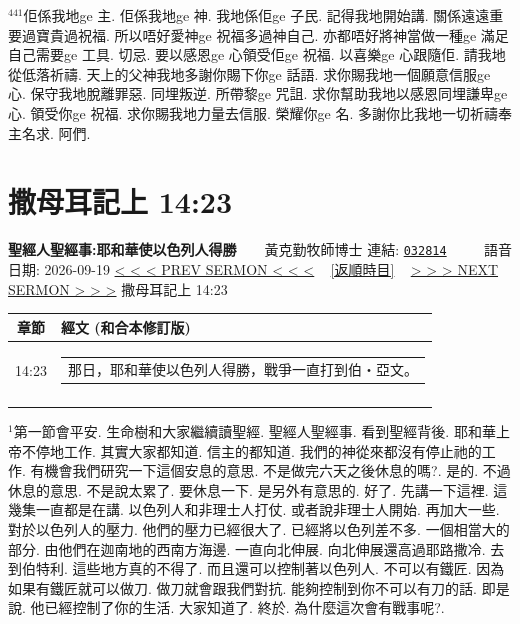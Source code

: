 \documentclass{book}
\begin{document}
$^{441}$佢係我地ge 主.
佢係我地ge 神.
我地係佢ge 子民.
記得我地開始講.
關係遠遠重要過寶貴過祝福.
所以唔好愛神ge 祝福多過神自己.
亦都唔好將神當做一種ge 滿足自己需要ge 工具.
切忌.
要以感恩ge 心領受佢ge 祝福.
以喜樂ge 心跟隨佢.
請我地從低落祈禱.
天上的父神我地多謝你賜下你ge 話語.
求你賜我地一個願意信服ge 心.
保守我地脫離罪惡.
同埋叛逆.
所帶黎ge 咒詛.
求你幫助我地以感恩同埋謙卑ge 心.
領受你ge 祝福.
求你賜我地力量去信服.
榮耀你ge 名.
多謝你比我地一切祈禱奉主名求.
阿們.
\newpage



\section{撒母耳記上 14:23}
\label{sec:032814}
\textbf{聖經人聖經事:耶和華使以色列人得勝}~~~~黃克勤牧師博士
\newline
\newline
連結: \href{http://www.church.com.hk/acms/content.asp?site=cdc\&op=show\&type=product\&code=032814\&layout=sermon}{\texttt{032814}} ~~~~ 語音日期: 2026-09-19
\newline
\newline
\hyperref[sec:032813]{\small{< < < PREV SERMON < < <}}
~
\hyperref[sec:index_chronic]{\small{[返順時目]}}
~
\hyperref[sec:032815]{\small{> > > NEXT SERMON > > >}}
\newline
\newline
撒母耳記上 14:23
\newline
\begin{longtable}{cl}
\hline
\hline
章節 & 經文 (和合本修訂版)\\
\hline
14:23 & \begin{tabularx}{0.7\textwidth}{X} 那日，耶和華使以色列人得勝，戰爭一直打到伯‧亞文。 \end{tabularx} \\ \\
[1ex]
\hline
\hline
\end{longtable}
$^{1}$第一節會平安.
生命樹和大家繼續讀聖經.
聖經人聖經事.
看到聖經背後.
耶和華上帝不停地工作.
其實大家都知道.
信主的都知道.
我們的神從來都沒有停止祂的工作.
有機會我們研究一下這個安息的意思.
不是做完六天之後休息的嗎?.
是的.
不過休息的意思.
不是說太累了.
要休息一下.
是另外有意思的.
好了.
先講一下這裡.
這幾集一直都是在講.
以色列人和非理士人打仗.
或者說非理士人開始.
再加大一些.
對於以色列人的壓力.
他們的壓力已經很大了.
已經將以色列差不多.
一個相當大的部分.
由他們在迦南地的西南方海邊.
一直向北伸展.
向北伸展還高過耶路撒冷.
去到伯特利.
這些地方真的不得了.
而且還可以控制著以色列人.
不可以有鐵匠.
因為如果有鐵匠就可以做刀.
做刀就會跟我們對抗.
能夠控制到你不可以有刀的話.
即是說.
他已經控制了你的生活.
大家知道了.
終於.
為什麼這次會有戰事呢?.
\end{document}

